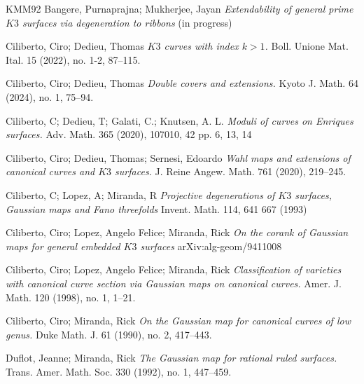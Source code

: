 \documentclass[11pt,twoside]{amsart}
\theoremstyle{plain}
\numberwithin{equation}{section}
\theoremstyle{definition}
\begin{document}
\begin{thebibliography}{KMM92}
Bangere, Purnaprajna; Mukherjee, Jayan  
\emph{Extendability of general prime $K3$ surfaces via degeneration to ribbons} (in progress)






Ciliberto, Ciro; Dedieu, Thomas
\emph{$K3$ curves with index $k>1$.}
Boll. Unione Mat. Ital. 15 (2022), no. 1-2, 87–115.

Ciliberto, Ciro; Dedieu, Thomas
\emph{Double covers and extensions.}
Kyoto J. Math. 64 (2024), no. 1, 75–94.


Ciliberto, C; Dedieu, T;  Galati, C.; Knutsen, A. L.  
\emph{Moduli of curves on Enriques surfaces.}
Adv. Math. 365 (2020), 107010, 42 pp. 6, 13, 14

Ciliberto, Ciro; Dedieu, Thomas; Sernesi, Edoardo
\emph{Wahl maps and extensions of canonical curves and $K3$ surfaces.}
J. Reine Angew. Math. 761 (2020), 219–245.

Ciliberto, C; Lopez, A; Miranda, R
\emph{Projective degenerations of $K3$ surfaces, Gaussian maps and Fano threefolds}
Invent. Math. 114, 641 667 (1993)

Ciliberto, Ciro; Lopez, Angelo Felice; Miranda, Rick
\emph{On the corank of Gaussian maps for general embedded $K3$ surfaces}
arXiv:alg-geom/9411008

Ciliberto, Ciro; Lopez, Angelo Felice; Miranda, Rick
\emph{Classification of varieties with canonical curve section via Gaussian maps on canonical curves.}
Amer. J. Math.   120 (1998), no. 1, 1–21.

Ciliberto, Ciro; Miranda, Rick
\emph{On the Gaussian map for canonical curves of low genus.}
Duke Math. J. 61 (1990), no. 2, 417–443.

Duflot, Jeanne; Miranda, Rick
\emph{The Gaussian map for rational ruled surfaces.}
Trans. Amer. Math. Soc. 330 (1992), no. 1, 447–459.


\end{thebibliography}
\end{document}
